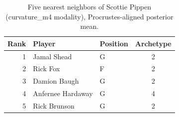 \begin{table}[htbp]
  \centering\small
  \begin{tabular}{rllc}
    \toprule
    Rank & Player & Position & Archetype \\
    \midrule
    1 & Jamal Shead & G & 2 \\
    2 & Rick Fox & F & 2 \\
    3 & Damion Baugh & G & 2 \\
    4 & Anfernee Hardaway & G & 4 \\
    5 & Rick Brunson & G & 2 \\
    \bottomrule
  \end{tabular}
  \caption{Five nearest neighbors of Scottie Pippen (curvature_m4 modality), Procrustes-aligned posterior mean.}
  \label{tab:Scottie_Pippen_neighbors_curvature_m4}
\end{table}

